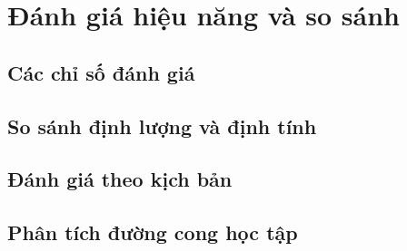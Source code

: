 \chapter{Đánh giá hiệu năng và so sánh}
\section{Các chỉ số đánh giá}
\section{So sánh định lượng và định tính}
\section{Đánh giá theo kịch bản}
\section{Phân tích đường cong học tập}